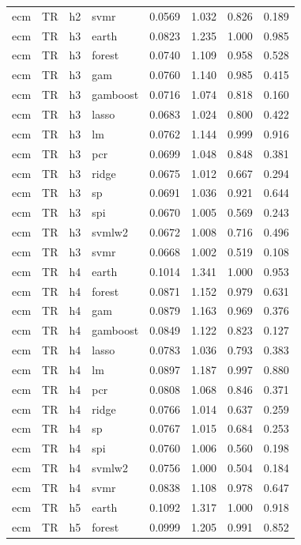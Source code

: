 \begin{ThreePartTable}
\begin{longtable}[t]{llclcccc}
ecm & TR & h2 & svmr & 0.0569 & 1.032 & 0.826 & 0.189\\
\addlinespace
ecm & TR & h3 & earth & 0.0823 & 1.235 & 1.000 & 0.985\\
ecm & TR & h3 & forest & 0.0740 & 1.109 & 0.958 & 0.528\\
ecm & TR & h3 & gam & 0.0760 & 1.140 & 0.985 & 0.415\\
ecm & TR & h3 & gamboost & 0.0716 & 1.074 & 0.818 & 0.160\\
ecm & TR & h3 & lasso & 0.0683 & 1.024 & 0.800 & 0.422\\
ecm & TR & h3 & lm & 0.0762 & 1.144 & 0.999 & 0.916\\
ecm & TR & h3 & pcr & 0.0699 & 1.048 & 0.848 & 0.381\\
ecm & TR & h3 & ridge & 0.0675 & 1.012 & 0.667 & 0.294\\
ecm & TR & h3 & sp & 0.0691 & 1.036 & 0.921 & 0.644\\
ecm & TR & h3 & spi & 0.0670 & 1.005 & 0.569 & 0.243\\
ecm & TR & h3 & svmlw2 & 0.0672 & 1.008 & 0.716 & 0.496\\
ecm & TR & h3 & svmr & 0.0668 & 1.002 & 0.519 & 0.108\\
\addlinespace
ecm & TR & h4 & earth & 0.1014 & 1.341 & 1.000 & 0.953\\
ecm & TR & h4 & forest & 0.0871 & 1.152 & 0.979 & 0.631\\
ecm & TR & h4 & gam & 0.0879 & 1.163 & 0.969 & 0.376\\
ecm & TR & h4 & gamboost & 0.0849 & 1.122 & 0.823 & 0.127\\
ecm & TR & h4 & lasso & 0.0783 & 1.036 & 0.793 & 0.383\\
ecm & TR & h4 & lm & 0.0897 & 1.187 & 0.997 & 0.880\\
ecm & TR & h4 & pcr & 0.0808 & 1.068 & 0.846 & 0.371\\
ecm & TR & h4 & ridge & 0.0766 & 1.014 & 0.637 & 0.259\\
ecm & TR & h4 & sp & 0.0767 & 1.015 & 0.684 & 0.253\\
ecm & TR & h4 & spi & 0.0760 & 1.006 & 0.560 & 0.198\\
ecm & TR & h4 & svmlw2 & 0.0756 & 1.000 & 0.504 & 0.184\\
ecm & TR & h4 & svmr & 0.0838 & 1.108 & 0.978 & 0.647\\
\addlinespace
ecm & TR & h5 & earth & 0.1092 & 1.317 & 1.000 & 0.918\\
ecm & TR & h5 & forest & 0.0999 & 1.205 & 0.991 & 0.852\\

\end{longtable}
\end{ThreePartTable}
